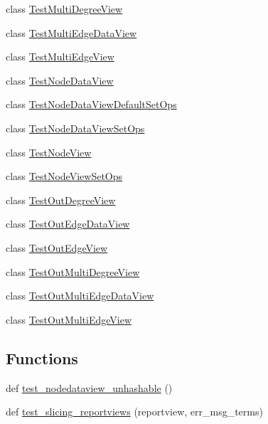 \begin{DoxyCompactItemize}
class \hyperlink{classnetworkx_1_1classes_1_1tests_1_1test__reportviews_1_1TestMultiDegreeView}{Test\+Multi\+Degree\+View}
\item 
class \hyperlink{classnetworkx_1_1classes_1_1tests_1_1test__reportviews_1_1TestMultiEdgeDataView}{Test\+Multi\+Edge\+Data\+View}
\item 
class \hyperlink{classnetworkx_1_1classes_1_1tests_1_1test__reportviews_1_1TestMultiEdgeView}{Test\+Multi\+Edge\+View}
\item 
class \hyperlink{classnetworkx_1_1classes_1_1tests_1_1test__reportviews_1_1TestNodeDataView}{Test\+Node\+Data\+View}
\item 
class \hyperlink{classnetworkx_1_1classes_1_1tests_1_1test__reportviews_1_1TestNodeDataViewDefaultSetOps}{Test\+Node\+Data\+View\+Default\+Set\+Ops}
\item 
class \hyperlink{classnetworkx_1_1classes_1_1tests_1_1test__reportviews_1_1TestNodeDataViewSetOps}{Test\+Node\+Data\+View\+Set\+Ops}
\item 
class \hyperlink{classnetworkx_1_1classes_1_1tests_1_1test__reportviews_1_1TestNodeView}{Test\+Node\+View}
\item 
class \hyperlink{classnetworkx_1_1classes_1_1tests_1_1test__reportviews_1_1TestNodeViewSetOps}{Test\+Node\+View\+Set\+Ops}
\item 
class \hyperlink{classnetworkx_1_1classes_1_1tests_1_1test__reportviews_1_1TestOutDegreeView}{Test\+Out\+Degree\+View}
\item 
class \hyperlink{classnetworkx_1_1classes_1_1tests_1_1test__reportviews_1_1TestOutEdgeDataView}{Test\+Out\+Edge\+Data\+View}
\item 
class \hyperlink{classnetworkx_1_1classes_1_1tests_1_1test__reportviews_1_1TestOutEdgeView}{Test\+Out\+Edge\+View}
\item 
class \hyperlink{classnetworkx_1_1classes_1_1tests_1_1test__reportviews_1_1TestOutMultiDegreeView}{Test\+Out\+Multi\+Degree\+View}
\item 
class \hyperlink{classnetworkx_1_1classes_1_1tests_1_1test__reportviews_1_1TestOutMultiEdgeDataView}{Test\+Out\+Multi\+Edge\+Data\+View}
\item 
class \hyperlink{classnetworkx_1_1classes_1_1tests_1_1test__reportviews_1_1TestOutMultiEdgeView}{Test\+Out\+Multi\+Edge\+View}
\end{DoxyCompactItemize}
\subsection*{Functions}
\begin{DoxyCompactItemize}
\item 
def \hyperlink{namespacenetworkx_1_1classes_1_1tests_1_1test__reportviews_a0cfc9f6546ae861bfb748c92ce9b98f4}{test\+\_\+nodedataview\+\_\+unhashable} ()
\item 
def \hyperlink{namespacenetworkx_1_1classes_1_1tests_1_1test__reportviews_aad6a586d85b1701c7cd6f76197b04f6a}{test\+\_\+slicing\+\_\+reportviews} (reportview, err\+\_\+msg\+\_\+terms)
\end{DoxyCompactItemize}


